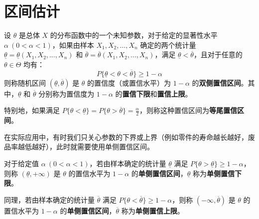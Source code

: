 \documentclass[lang=cn,11pt]{elegantbook}
\begin{document}
\chapter{区间估计}

\begin{definition}[置信区间与置信水平] \label{def:confidence_interval}
设 $\theta$ 是总体 $X$ 的分布函数中的一个未知参数，对于给定的显著性水平 $\alpha\ (0<\alpha<1)$，如果由样本 $X_1,X_2,\dots,X_n$ 确定的两个统计量 $\underline{\theta}=\underline{\theta}(X_1,X_2,\dots,X_n)$ 和 $\overline{\theta}=\overline{\theta}(X_1,X_2,\dots,X_n)$，满足 $\underline{\theta} < \overline{\theta}$，且对于任意的 $\theta \in \Theta$ 均有：
\begin{equation}
P\{\underline{\theta}<\theta<\overline{\theta}\} \ge 1-\alpha
\end{equation}
则称随机区间 $(\underline{\theta},\overline{\theta})$ 是 $\theta$ 的置信度（或置信水平）为 $1-\alpha$ 的\textbf{双侧置信区间}。其中，$\underline{\theta}$ 和 $\overline{\theta}$ 分别称为置信度为 $1-\alpha$ 的\textbf{置信下限}和\textbf{置信上限}。

特别地，如果满足 $P\{\theta < \underline{\theta}\} = P\{\theta > \overline{\theta}\} = \frac{\alpha}{2}$，则称这种置信区间为\textbf{等尾置信区间}。
\end{definition}

在实际应用中，有时我们只关心参数的下界或上界（例如零件的寿命越长越好，废品率越低越好），此时就需要使用单侧置信区间。

\begin{definition}[单侧置信区间] \label{def:one_sided_confidence_interval}
对于给定值 $\alpha\ (0<\alpha<1)$，若由样本确定的统计量 $\underline{\theta}$ 满足 $P\{\theta > \underline{\theta}\} \ge 1-\alpha$，则称 $(\underline{\theta},+\infty)$ 是 $\theta$ 的置信水平为 $1-\alpha$ 的\textbf{单侧置信区间}，$\underline{\theta}$ 称为\textbf{单侧置信下限}。

同理，若由样本确定的统计量 $\overline{\theta}$ 满足 $P\{\theta < \overline{\theta}\} \ge 1-\alpha$，则称 $(-\infty,\overline{\theta})$ 是 $\theta$ 的置信水平为 $1-\alpha$ 的\textbf{单侧置信区间}，$\overline{\theta}$ 称为\textbf{单侧置信上限}。
\end{definition}
\end{document}
